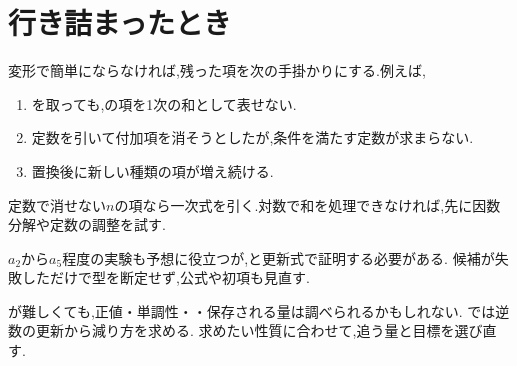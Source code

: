 \section{行き詰まったとき}\label{節：行き詰まったとき}

変形で簡単にならなければ,残った項を次の手掛かりにする.例えば,
\begin{enumerate}
  \item {}を取っても,の項を1次の和として表せない.
  \item 定数を引いて付加項を消そうとしたが,条件を満たす定数が求まらない.
  \item 置換後に新しい種類の項が増え続ける.
\end{enumerate}
定数で消せない$n$の項なら一次式を引く.対数で和を処理できなければ,先に因数分解や定数の調整を試す.
\BookFigFallback

$a_2$から$a_5$程度の実験も予想に役立つが,と更新式で証明する必要がある.
候補が失敗しただけで型を断定せず,公式や初項も見直す.

が難しくても,正値・単調性・・保存される量は調べられるかもしれない.
では逆数の更新から減り方を求める.
求めたい性質に合わせて,追う量と目標を選び直す.

